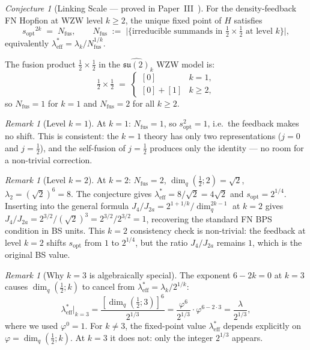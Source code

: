 \documentclass[11pt,a4paper]{article}
\newcommand{\vp}{\varphi}
\newcommand{\lam}{\lambda}
\newcommand{\leff}{\lambda_{\mathrm{eff}}}
\newcommand{\Ja}{J_{2a}}
\newcommand{\Jfour}{J_{4}}
\newcommand{\sopt}{s_{\mathrm{opt}}}
\theoremstyle{remark}
\newtheorem{remark}[theorem]{Remark}
\newtheorem{conjecture}[theorem]{Conjecture}
\begin{document}
\begin{conjecture}[Linking Scale --- proved in Paper~III~\cite{Paper3}]
\label{P2:conj:lsl}
For the density-feedback FN Hopfion at WZW level $k\geq 2$,
the unique fixed point of $H$ satisfies
\begin{equation}
  {\sopt}^{2k} \;=\; N_{\mathrm{fus}},
  \qquad
  N_{\mathrm{fus}}
  \;:=\;
  \bigl|\{\text{irreducible summands in }
  \tfrac{1}{2}\times\tfrac{1}{2}\text{ at level }k\}\bigr|,
  \label{P2:eq:lsl_conj}
\end{equation}
equivalently $\leff^* = \lam_k/N_{\mathrm{fus}}^{1/k}$.
\end{conjecture}

The fusion product $\frac{1}{2}\times\frac{1}{2}$ in the
$\widehat{\mathfrak{su}(2)}_k$ WZW model is:
\[
  \tfrac{1}{2}\times\tfrac{1}{2}
  \;=\;
  \begin{cases}
    [0] & k=1,\\
    [0]+[1] & k\geq 2,
  \end{cases}
\]
so $N_{\mathrm{fus}}=1$ for $k=1$ and $N_{\mathrm{fus}}=2$ for all
$k\geq 2$.

\begin{remark}[Level $k=1$]
At $k=1$: $N_{\mathrm{fus}}=1$, so $\sopt^2=1$, i.e.\ the feedback
makes no shift.  This is consistent: the $k=1$ theory has only two
representations ($j=0$ and $j=\frac{1}{2}$), and the self-fusion of
$j=\frac{1}{2}$ produces only the identity --- no room for a
non-trivial correction.
\end{remark}

\begin{remark}[Level $k=2$]
At $k=2$: $N_{\mathrm{fus}}=2$, $\dim_q(\frac{1}{2};2)=\sqrt{2}$,
$\lam_2 = (\sqrt{2})^6 = 8$.
The conjecture gives $\leff^* = 8/\sqrt{2} = 4\sqrt{2}$ and
$\sopt = 2^{1/4}$.
Inserting into the general formula $\Jfour/\Ja = 2^{1+1/k}/\dim_q^{2k-1}$
at $k=2$ gives $\Jfour/\Ja = 2^{3/2}/(\sqrt{2})^3 = 2^{3/2}/2^{3/2} = 1$,
recovering the standard FN BPS condition in BS units.  This $k=2$
consistency check is non-trivial: the feedback at level $k=2$ shifts
$\sopt$ from $1$ to $2^{1/4}$, but the ratio $\Jfour/\Ja$ remains
$1$, which is the original BS value.
\end{remark}

\begin{remark}[Why $k=3$ is algebraically special]
The exponent $6-2k = 0$ at $k=3$ causes $\dim_q(\frac{1}{2};k)$ to
cancel from $\leff^* = \lam_k/2^{1/k}$:
\[
  \leff^*\big|_{k=3}
  = \frac{[\dim_q(\tfrac{1}{2};3)]^6}{2^{1/3}}
  = \frac{\vp^6}{2^{1/3}}\cdot\vp^{6-2\cdot 3}
  = \frac{\lam}{2^{1/3}},
\]
where we used $\vp^0=1$.  For $k\neq 3$, the fixed-point value
$\leff^*$ depends explicitly on $\vp=\dim_q(\frac{1}{2};k)$.
At $k=3$ it does not: only the integer $2^{1/3}$ appears.
\end{remark}
\end{document}
